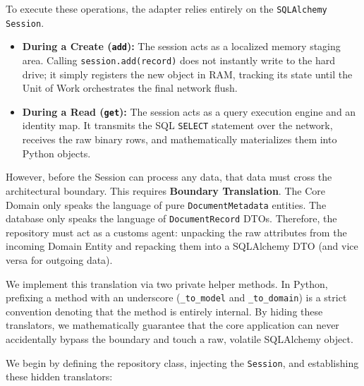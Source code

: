 To execute these operations, the adapter relies entirely on the \texttt{SQLAlchemy} \texttt{Session}.
\begin{itemize}
    \item \textbf{During a Create (\texttt{add}):} The session acts as a localized memory staging area. Calling \texttt{session.add(record)} does not instantly write to the hard drive; it simply registers the new object in RAM, tracking its state until the Unit of Work orchestrates the final network flush.
    \item \textbf{During a Read (\texttt{get}):} The session acts as a query execution engine and an identity map. It transmits the SQL \texttt{SELECT} statement over the network, receives the raw binary rows, and mathematically materializes them into Python objects.
\end{itemize}

However, before the Session can process any data, that data must cross the architectural boundary. This requires \textbf{Boundary Translation}. The Core Domain only speaks the language of pure \texttt{DocumentMetadata} entities. The database only speaks the language of \texttt{DocumentRecord} DTOs. Therefore, the repository must act as a customs agent: unpacking the raw attributes from the incoming Domain Entity and repacking them into a SQLAlchemy DTO (and vice versa for outgoing data).

We implement this translation via two private helper methods. In Python, prefixing a method with an underscore (\texttt{\_to\_model} and \texttt{\_to\_domain}) is a strict convention denoting that the method is entirely internal. By hiding these translators, we mathematically guarantee that the core application can never accidentally bypass the boundary and touch a raw, volatile SQLAlchemy object.

We begin by defining the repository class, injecting the \texttt{Session}, and establishing these hidden translators:

